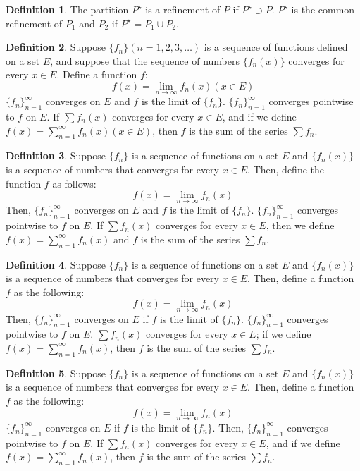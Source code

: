 \documentclass[12pt]{article}
\theoremstyle{definition}
\newtheorem{definition}{Definition}
\theoremstyle{named}
\begin{document}
\renewcommand{\thedefinition}{6.3}
\begin{definition}
    The partition $P^\star$ is a refinement of $P$ if $P^\star \supset P$. $P^\star$ is the common refinement of $P_1$ and $P_2$ if $P^\star = P_1 \cup P_2$. 
\end{definition}

\renewcommand{\thedefinition}{7.1}
\begin{definition}
Suppose $\{f_n\} (n=1,2,3,\dots)$ is a sequence of functions defined on a set $E$, and suppose that the sequence of numbers $\{f_n(x)\}$ converges for every $x \in E$. Define a function $f$: 
$$
f(x) = \lim_{n \to \infty} f_n(x)  (x \in E)
$$
$\{f_n\}_{n=1}^{\infty}$ converges on $E$ and $f$ is the limit of $\{f_n\}$. $\{f_n\}_{n=1}^{\infty}$ converges pointwise to $f$ on $E$. If $\sum f_n(x)$ converges for every $x \in E$, and if we define $f(x) = \sum_{n=1}^{\infty} f_n(x) (x \in E)$, then $f$ is the sum of the series $\sum f_n$. 
\end{definition}

\renewcommand{\thedefinition}{7.1}
\begin{definition}
    Suppose $\{f_n\}$ is a sequence of functions on a set $E$ and $\{f_n(x)\}$ is a sequence of numbers that converges for every $x \in E$. Then, define the function $f$ as follows: 
    $$
    f(x) = \lim_{n \to \infty} f_n(x)
    $$
    Then, $\{f_n\}_{n=1}^{\infty}$ converges on $E$ and $f$ is the limit of $\{f_n\}$. $\{f_n\}_{n=1}^{\infty}$ converges pointwise to $f$ on $E$. If $\sum f_n(x)$ converges for every $x \in E$, then we define $f(x) = \sum_{n=1}^{\infty} f_n(x)$ and $f$ is the sum of the series $\sum f_n$. 
\end{definition}

\renewcommand{\thedefinition}{7.1}
\begin{definition}
    Suppose $\{f_n\}$ is a sequence of functions on a set $E$ and $\{f_n(x)\}$ is a sequence of numbers that converges for every $x \in E$. Then, define a function $f$ as the following: 
    $$
    f(x) = \lim_{n \to \infty} f_n(x)
    $$
    Then, $\{f_n\}_{n=1}^{\infty}$ converges on $E$ if $f$ is the limit of $\{f_n\}$. $\{f_n\}_{n=1}^{\infty}$ converges pointwise to $f$ on $E$. $\sum f_n(x)$ converges for every $x \in E$; if we define $f(x) = \sum_{n=1}^{\infty} f_n(x)$, then $f$ is the sum of the series $\sum f_n$. 
\end{definition}

\renewcommand{\thedefinition}{7.1}
\begin{definition}
    Suppose $\{f_n\}$ is a sequence of functions on a set $E$ and $\{f_n(x)\}$ is a sequence of numbers that converges for every $x \in E$. Then, define a function $f$ as the following:
    $$
    f(x) = \lim_{n \to \infty} f_n(x)
    $$
    $\{f_n\}_{n=1}^{\infty}$ converges on $E$ if $f$ is the limit of $\{f_n\}$. Then, $\{f_n\}_{n=1}^{\infty}$ converges pointwise to $f$ on $E$. If $\sum f_n(x)$ converges for every $x \in E$, and if we define $f(x) = \sum_{n=1}^{\infty} f_n(x)$, then $f$ is the sum of the series $\sum f_n$. 
\end{definition}
\end{document}
